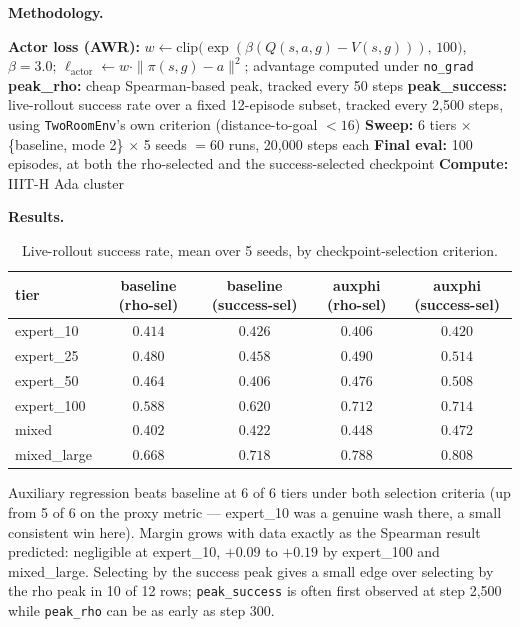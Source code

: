 \documentclass[11pt]{article}
\begin{document}
\textbf{Methodology.}

\begin{algorithm}[H]
\caption{Live-rollout methodology}
\begin{algorithmic}[1]
\State \textbf{Actor loss (AWR):} $w \gets \mathrm{clip}\bigl(\exp(\beta(Q(s,a,g)-V(s,g))),\,100\bigr)$, $\beta=3.0$; $\ell_{\text{actor}} \gets w\cdot\|\pi(s,g)-a\|^2$; advantage computed under \texttt{no\_grad}
\State \textbf{peak\_rho:} cheap Spearman-based peak, tracked every 50 steps
\State \textbf{peak\_success:} live-rollout success rate over a fixed 12-episode subset, tracked every 2{,}500 steps, using \texttt{TwoRoomEnv}'s own criterion (distance-to-goal $<16$)
\State \textbf{Sweep:} 6 tiers $\times$ \{baseline, mode 2\} $\times$ 5 seeds $= 60$ runs, 20{,}000 steps each 
\State \textbf{Final eval:} 100 episodes, at both the rho-selected and the success-selected checkpoint
\State \textbf{Compute:} IIIT-H Ada cluster
\end{algorithmic}
\end{algorithm}

\textbf{Results.}

\begin{table}[h]
\centering
\small
\caption{Live-rollout success rate, mean over 5 seeds, by checkpoint-selection criterion.}
\begin{tabular}{lcccc}
\toprule
tier & baseline (rho-sel) & baseline (success-sel) & \textbf{auxphi (rho-sel)} & \textbf{auxphi (success-sel)} \\
\midrule
expert\_10   & $0.414$ & $0.426$ & $0.406$ & $0.420$ \\
expert\_25   & $0.480$ & $0.458$ & $0.490$ & $\mathbf{0.514}$ \\
expert\_50   & $0.464$ & $0.406$ & $\mathbf{0.476}$ & $\mathbf{0.508}$ \\
expert\_100  & $0.588$ & $0.620$ & $\mathbf{0.712}$ & $\mathbf{0.714}$ \\
mixed        & $0.402$ & $0.422$ & $0.448$ & $\mathbf{0.472}$ \\
mixed\_large & $0.668$ & $0.718$ & $\mathbf{0.788}$ & $\mathbf{0.808}$ \\
\bottomrule
\end{tabular}
\end{table}

Auxiliary regression beats baseline at 6 of 6 tiers under both selection criteria (up from 5 of 6
on the proxy metric --- expert\_10 was a genuine wash there, a small consistent win here). Margin
grows with data exactly as the Spearman result predicted: negligible at expert\_10, $+0.09$ to
$+0.19$ by expert\_100 and mixed\_large. Selecting by the success peak gives a small edge over
selecting by the rho peak in 10 of 12 rows; \texttt{peak\_success} is often first observed at
step 2{,}500 while \texttt{peak\_rho} can be as early as step 300.
\end{document}

